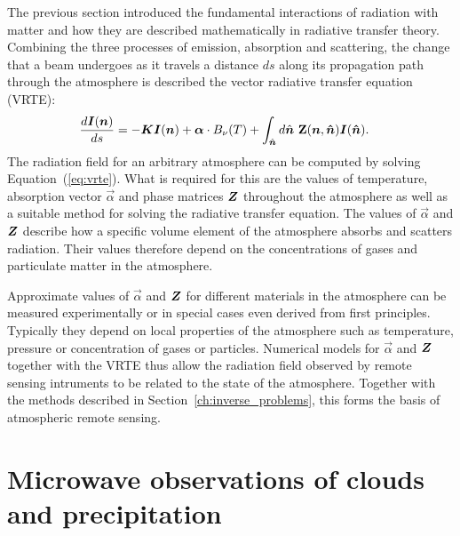 The previous section introduced the fundamental interactions of radiation
with matter and how they are described mathematically in radiative transfer
theory. Combining the three processes of emission, absorption and scattering,
the change that a beam undergoes as it travels a distance $ds$ along its
propagation path through the atmosphere is described the vector radiative
transfer equation (VRTE):
\begin{align}\label{eq:vrte}
  \frac{d\boldsymbol{I}(\boldsymbol{n})}{ds} &=
  -\boldsymbol{K}\boldsymbol{I}(\boldsymbol{n}) + \boldsymbol{\alpha} \cdot B_\nu(T) + \int_{\hat{\boldsymbol{n}}} d\hat{\boldsymbol{n}} \ \mathbf{Z}(\boldsymbol{n}, \boldsymbol{\hat{n}}) \boldsymbol{I}(\boldsymbol{\hat{n}}).
  \end{align}
The radiation field for an arbitrary atmosphere can be computed by solving
Equation~(\ref{eq:vrte}). What is required for this are the values of
temperature, absorption vector $\vec{\alpha}$ and phase matrices $\boldsymbol{Z}$
throughout the atmosphere as well as a suitable method for solving the radiative
transfer equation. The values of $\vec{\alpha}$ and $\boldsymbol{Z}$ describe how a
specific volume element of the atmosphere absorbs and scatters radiation. Their
values therefore depend on the concentrations of gases and particulate matter in
the atmosphere.

Approximate values of $\vec{\alpha}$ and $\boldsymbol{Z}$ for different materials in
the atmosphere can be measured experimentally or in special cases even derived
from first principles. Typically they depend on local properties of the
atmosphere such as temperature, pressure or concentration of gases or particles.
Numerical models for $\vec{\alpha}$ and $\boldsymbol{Z}$ together with the VRTE thus
allow the radiation field observed by remote sensing intruments to be related to
the state of the atmosphere. Together with the methods described in
Section~\ref{ch:inverse_problems}, this forms the basis of atmospheric
remote sensing.


\section{Microwave observations of clouds and precipitation} 

